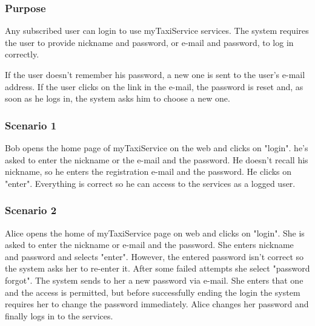 \label{user-login}
\subsubsection{Purpose}
Any subscribed user can login to use myTaxiService services.
The system requires the user to provide nickname and password, or e-mail and password, to log in correctly.

If the user doesn't remember his password, a new one is sent to the user's e-mail address. If the user clicks on the link in the e-mail, the password is reset and, as soon as he logs in, the system asks him to choose a new one. 


\subsubsection{Scenario 1}
Bob opens the home page of myTaxiService on the web and clicks on "login". 
he's asked to enter the nickname or the e-mail and the password. He doesn't recall his nickname, so he enters the registration e-mail and the password. He clicks on "enter". 
Everything is correct so he can access to the services as a logged user.

\subsubsection{Scenario 2}
Alice opens the home of myTaxiService page on web and clicks on "login".  
She is asked to enter the nickname or e-mail and the password.
She enters nickname and password and selects "enter". However, the entered password isn't correct so the system asks her to re-enter it. 
After some failed attempts she select "password forgot".
The system sends to her a new password via e-mail. She enters that one and the access is permitted, but before successfully ending the login the system requires her to change the password immediately. 
Alice changes her password and finally logs in to the services.

